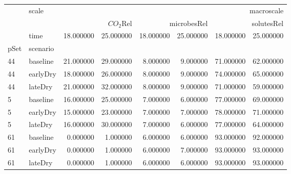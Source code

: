 \begin{tabular}{llrrrrrr}
 & scale & \multicolumn{6}{r}{macroscale} \\
 &  & \multicolumn{2}{r}{$CO_2$Rel} & \multicolumn{2}{r}{microbesRel} & \multicolumn{2}{r}{solutesRel} \\
 & time & 18.000000 & 25.000000 & 18.000000 & 25.000000 & 18.000000 & 25.000000 \\
pSet & scenario &  &  &  &  &  &  \\
44 & baseline & 21.000000 & 29.000000 & 8.000000 & 9.000000 & 71.000000 & 62.000000 \\
44 & earlyDry & 18.000000 & 26.000000 & 8.000000 & 9.000000 & 74.000000 & 65.000000 \\
44 & lateDry & 21.000000 & 32.000000 & 8.000000 & 9.000000 & 71.000000 & 59.000000 \\
5 & baseline & 16.000000 & 25.000000 & 7.000000 & 6.000000 & 77.000000 & 69.000000 \\
5 & earlyDry & 15.000000 & 23.000000 & 7.000000 & 7.000000 & 78.000000 & 71.000000 \\
5 & lateDry & 16.000000 & 30.000000 & 7.000000 & 6.000000 & 77.000000 & 64.000000 \\
61 & baseline & 0.000000 & 1.000000 & 6.000000 & 6.000000 & 93.000000 & 92.000000 \\
61 & earlyDry & 0.000000 & 1.000000 & 6.000000 & 7.000000 & 93.000000 & 93.000000 \\
61 & lateDry & 0.000000 & 1.000000 & 6.000000 & 6.000000 & 93.000000 & 93.000000 \\
\end{tabular}
